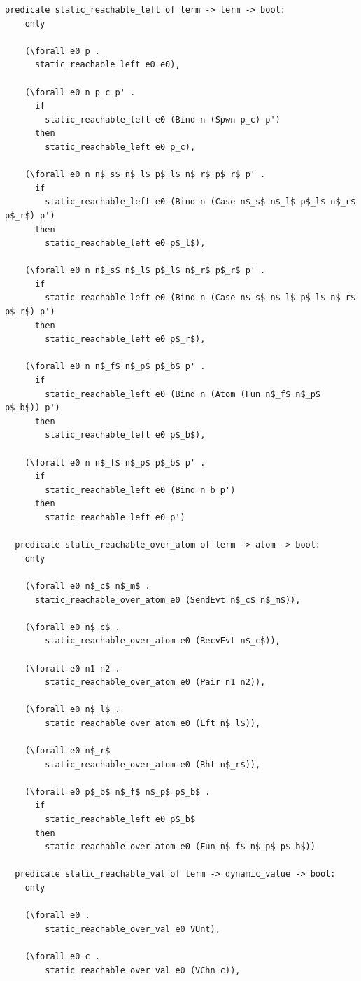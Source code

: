 \documentclass[10pt]{article}
\begin{document}
\begin{lstlisting}[language=logic, mathescape]
  predicate static_reachable_left of term -> term -> bool:
    only

    (\forall e0 p .
      static_reachable_left e0 e0),

    (\forall e0 n p_c p' .
      if 
        static_reachable_left e0 (Bind n (Spwn p_c) p')
      then
        static_reachable_left e0 p_c),

    (\forall e0 n n$_s$ n$_l$ p$_l$ n$_r$ p$_r$ p' .
      if
        static_reachable_left e0 (Bind n (Case n$_s$ n$_l$ p$_l$ n$_r$ p$_r$) p')
      then
        static_reachable_left e0 p$_l$),

    (\forall e0 n n$_s$ n$_l$ p$_l$ n$_r$ p$_r$ p' .
      if
        static_reachable_left e0 (Bind n (Case n$_s$ n$_l$ p$_l$ n$_r$ p$_r$) p')
      then
        static_reachable_left e0 p$_r$),

    (\forall e0 n n$_f$ n$_p$ p$_b$ p' .
      if
        static_reachable_left e0 (Bind n (Atom (Fun n$_f$ n$_p$ p$_b$)) p')
      then
        static_reachable_left e0 p$_b$),

    (\forall e0 n n$_f$ n$_p$ p$_b$ p' .
      if
        static_reachable_left e0 (Bind n b p')
      then
        static_reachable_left e0 p')

  predicate static_reachable_over_atom of term -> atom -> bool:
    only

    (\forall e0 n$_c$ n$_m$ .
      static_reachable_over_atom e0 (SendEvt n$_c$ n$_m$)),

    (\forall e0 n$_c$ .
        static_reachable_over_atom e0 (RecvEvt n$_c$)),

    (\forall e0 n1 n2 .
        static_reachable_over_atom e0 (Pair n1 n2)),

    (\forall e0 n$_l$ .
        static_reachable_over_atom e0 (Lft n$_l$)),

    (\forall e0 n$_r$
        static_reachable_over_atom e0 (Rht n$_r$)),

    (\forall e0 p$_b$ n$_f$ n$_p$ p$_b$ . 
      if
        static_reachable_left e0 p$_b$ 
      then
        static_reachable_over_atom e0 (Fun n$_f$ n$_p$ p$_b$))

  predicate static_reachable_val of term -> dynamic_value -> bool:
    only

    (\forall e0 .
        static_reachable_over_val e0 VUnt),

    (\forall e0 c .
        static_reachable_over_val e0 (VChn c)),


\end{lstlisting}
\end{document}
